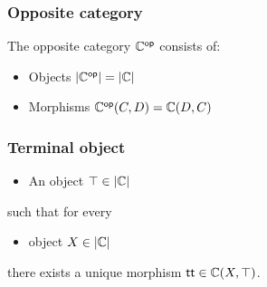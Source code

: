 \documentclass[usenames,dvipsnames,rgb]{beamer}
\begin{document}

\newcommand{\CatOp}[1]{{#1}^{\mathsf{op}}}

\begin{frame}
\frametitle{Opposite category}

The opposite category $\CatOp{\aCategory}$ consists of:
\begin{itemize}
\item Objects $\CatObj{\CatOp{\aCategory}} = \CatObj{\aCategory}$
\item Morphisms $\CatMorph[\CatOp{\aCategory}]{C}{D} = \CatMorph[\aCategory]{D}{C}$
\end{itemize}


\end{frame}

\newcommand{\TermObj}{\top}
\newcommand{\TermMorph}{\mathsf{tt}}

\begin{frame}[fragile]
  \frametitle{Terminal object}

  \begin{itemize}
  \item An object $\TermObj \in \CatObj{\aCategory}$
  \end{itemize}
  such that for every
  \begin{itemize}
  \item object $X \in  \CatObj{\aCategory}$
  \end{itemize}
  there exists a unique morphism $\TermMorph \in \CatMorph[\aCategory]{X}{\TermObj}$.

  \begin{center}
  \end{center}


\end{frame}


\newcommand{\ProdObj}[2]{\ensuremath{#1 \times #2}}
\newcommand{\ProdMorph}[2]{\ensuremath{[ #1 \mathop{,} #2 ]}}
\newcommand{\ProdFst}{\pi_1}
\newcommand{\ProdSnd}{\pi_2}
\end{document}

